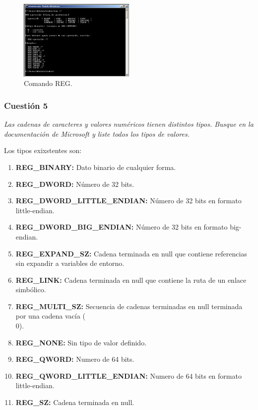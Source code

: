 \begin{figure}[H]
  \begin{center}
    \includegraphics[width=0.5\textwidth]{imagenes/8}
    \caption{Comando REG.}
    \label{fig8}
  \end{center}
\end{figure}

\subsubsection{Cuestión 5}
\textit{Las cadenas de caracteres y valores numéricos tienen distintos tipos. Busque en la documentación de Microsoft y liste todos los tipos de valores.}

Los tipos exixstentes son: \cite{reg3}
\begin{enumerate}
    \item \textbf{REG\_BINARY: }Dato binario de cualquier forma.
    \item \textbf{REG\_DWORD: }Número de 32 bits.
    \item \textbf{REG\_DWORD\_LITTLE\_ENDIAN: }Número de 32 bits en formato little-endian.
    \item \textbf{REG\_DWORD\_BIG\_ENDIAN:} Número de 32 bits en formato big-endian.
    \item \textbf{REG\_EXPAND\_SZ: }Cadena terminada en null que contiene referencias sin expandir a variables de entorno.
    \item \textbf{REG\_LINK: }Cadena terminada en null que contiene la ruta de un enlace simbólico.
    \item \textbf{REG\_MULTI\_SZ:} Secuencia de cadenas terminadas en null terminada por una cadena vacía (\\0).
    \item \textbf{REG\_NONE: }Sin tipo de valor definido.
    \item \textbf{REG\_QWORD: }Numero de 64 bits.
    \item \textbf{REG\_QWORD\_LITTLE\_ENDIAN:} Numero de 64 bits en formato little-endian.
    \item \textbf{REG\_SZ: }Cadena terminada en null.
\end{enumerate}


